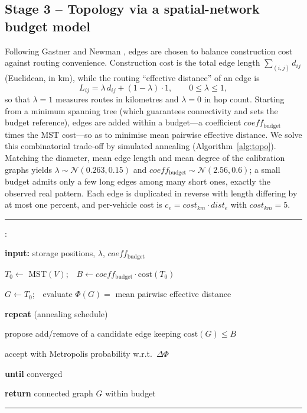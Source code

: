\documentclass[runningheads]{llncs}
\newcounter{algln}
\newenvironment{pcode}{%
  \setcounter{algln}{0}%
  \par\vspace{2pt}\hrule\vspace{3pt}%
  \begin{list}{\footnotesize\ttfamily\stepcounter{algln}\thealgln:}%
    {\setlength{\leftmargin}{2.2em}\setlength{\itemsep}{0pt}%
     \setlength{\parsep}{0pt}\setlength{\topsep}{0pt}}%
}{%
  \end{list}\vspace{2pt}\hrule\vspace{2pt}%
}
\newcommand{\KW}[1]{\textbf{#1}}
\newcommand{\IND}{\hspace*{1.3em}}
\begin{document}
\subsection{Stage 3 -- Topology via a spatial-network budget model}
\label{sec:topo}
Following Gastner and Newman \cite{gastner2006}, edges are chosen to balance
construction cost against routing convenience. Construction cost is the total
edge length $\sum_{(i,j)} d_{ij}$ (Euclidean, in km), while the routing
``effective distance'' of an edge is
\begin{equation}
L_{ij}=\lambda\,d_{ij}+(1-\lambda)\cdot 1, \qquad 0\le\lambda\le1,
\end{equation}
so that $\lambda=1$ measures routes in kilometres and $\lambda=0$ in hop count.
Starting from a minimum spanning tree (which guarantees connectivity and sets the
budget reference), edges are added within a budget---a coefficient
$coeff_{\text{budget}}$ times the MST cost---so as to minimise mean pairwise
effective distance. We solve this combinatorial trade-off by simulated annealing
(Algorithm~\ref{alg:topo}). Matching the diameter, mean edge length and mean
degree of the calibration graphs yields $\lambda\sim\mathcal{N}(0.263,0.15)$ and
$coeff_{\text{budget}}\sim\mathcal{N}(2.56,0.6)$; a small budget admits only a
few long edges among many short ones, exactly the observed real pattern. Each
edge is duplicated in reverse with length differing by at most one percent, and
per-vehicle cost is $c_e=cost_{km}\cdot dist_e$ with $cost_{km}=5$.

\begin{algorithm}[t]
\caption{Budget-constrained topology by simulated annealing.}
\label{alg:topo}
\begin{pcode}
\item \KW{input:} storage positions, $\lambda$, $coeff_{\text{budget}}$
\item $T_0\gets$ MST$(V)$;\ \ $B\gets coeff_{\text{budget}}\cdot \text{cost}(T_0)$
\item $G\gets T_0$;\ \ evaluate $\Phi(G)=$ mean pairwise effective distance
\item \KW{repeat} (annealing schedule)
\item \IND propose add/remove of a candidate edge keeping $\text{cost}(G)\le B$
\item \IND accept with Metropolis probability w.r.t.\ $\Delta\Phi$
\item \KW{until} converged
\item \KW{return} connected graph $G$ within budget
\end{pcode}
\end{algorithm}
\end{document}
